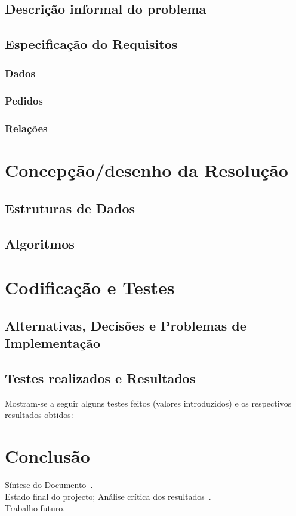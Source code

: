\documentclass[11pt,a4paper]{report}%
\begin{document}
\section{Descrição informal do problema} \label{sec:descricaoProblema} %
\section{Especificação do Requisitos}
\subsection{Dados} \label{subsec:dados} %
\subsection{Pedidos}
\subsection{Relações}

\chapter{Concepção/desenho da Resolução}
\section{Estruturas de Dados}
\section{Algoritmos}

\chapter{Codificação e Testes}
\section{Alternativas, Decisões e Problemas de Implementação}
\section{Testes realizados e Resultados}
Mostram-se a seguir alguns testes feitos (valores introduzidos) e
os respectivos resultados obtidos:


\chapter{Conclusão} \label{concl}
Síntese do Documento~\cite{araujo:2018,martini:2018}.\\
Estado final do projecto; Análise crítica dos resultados~\cite{Sto77a}.\\
Trabalho futuro.
\end{document}

